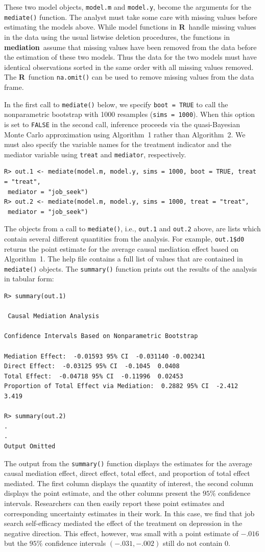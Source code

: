 \documentclass[11pt,letterpaper]{article}
\theoremstyle{plain}
\newcommand\bR{{\bf R}}
\newcommand\bmediation{{\bf mediation}}
\begin{document}
These two model objects, {\tt model.m} and {\tt model.y}, become the
arguments for the \texttt{mediate()} function.  The analyst must take
some care with missing values before estimating the models above.
While model functions in \bR\ handle missing values in the data using
the usual listwise deletion procedures, the functions in \bmediation\
assume that missing values have been removed from the data before the
estimation of these two models.  Thus the data for the two models must
have identical observations sorted in the same order with all missing
values removed.  The \bR\ function \texttt{na.omit()} can be used to
remove missing values from the data frame.

In the first call to \texttt{mediate()} below, we specify \texttt{boot
  = TRUE} to call the nonparametric bootstrap with 1000 resamples
({\tt sims = 1000}). When this option is set to {\tt FALSE} in the second
call, inference proceeds via the quasi-Bayesian Monte Carlo
approximation using Algorithm~1 rather than Algorithm~2.  We must also
specify the variable names for the treatment indicator and the
mediator variable using {\tt treat} and {\tt mediator}, respectively.
\begin{verbatim}
R> out.1 <- mediate(model.m, model.y, sims = 1000, boot = TRUE, treat = "treat",
 mediator = "job_seek")
R> out.2 <- mediate(model.m, model.y, sims = 1000, treat = "treat", 
 mediator = "job_seek")
\end{verbatim}
The objects from a call to \texttt{mediate()}, i.e., {\tt out.1} and
{\tt out.2} above, are lists which contain several different
quantities from the analysis.  For example, \texttt{out.1\$d0} returns
the point estimate for the average causal mediation effect based on
Algorithm~1.  The help file contains a full list of values that are
contained in \texttt{mediate()} objects. The \texttt{summary()}
function prints out the results of the analysis in tabular form:
\begin{verbatim}
R> summary(out.1)

 Causal Mediation Analysis 

Confidence Intervals Based on Nonparametric Bootstrap

Mediation Effect:  -0.01593 95% CI  -0.031140 -0.002341 
Direct Effect:  -0.03125 95% CI  -0.1045  0.0408 
Total Effect:  -0.04718 95% CI  -0.11996  0.02453 
Proportion of Total Effect via Mediation:  0.2882 95% CI  -2.412  3.419 

R> summary(out.2)
.
.
Output Omitted
\end{verbatim}
The output from the {\tt summary()} function displays the estimates
for the average causal mediation effect, direct effect, total effect,
and proportion of total effect mediated. The first column displays the
quantity of interest, the second column displays the point estimate,
and the other columns present the $95\%$ confidence intervals.
Researchers can then easily report these point estimates and
corresponding uncertainty estimates in their work. In this case, we
find that job search self-efficacy mediated the effect of the
treatment on depression in the negative direction. This effect,
however, was small with a point estimate of $-.016$ but the $95\%$
confidence intervals $(-.031,-.002)$ still do not contain $0$.
\end{document}
